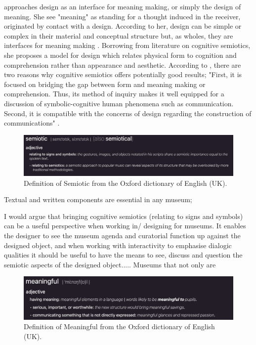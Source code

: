 \autocite{kazmierczak_meaningmaking_2003} approaches design as an interface for meaning making, or simply the design of meaning. She see "meaning" as standing for a thought induced in the receiver, originated by contact with a design. According to her, design can be simple or complex in their material and conceptual structure but, as wholes, they are interfaces for meaning making \autocite[p. 47]{kazmierczak_meaningmaking_2003}. Borrowing from literature on cognitive semiotics, she proposes a model for design which relates physical form to cognition and comprehension rather than appearance and aesthetic. According to \autocite{kazmierczak_meaningmaking_2003}, there are two reasons why cognitive semiotics offers potentially good results; "First, it is focused on bridging the gap between form and meaning making or comprehension. Thus, its method of inquiry makes it well equipped for a discussion of symbolic-cognitive human phenomena such as communication. Second, it is compatible with the concerns of design regarding the construction of communications" \autocite[p. 47]{kazmierczak_meaningmaking_2003}. 

\begin{figure}[H]
\includegraphics[width=12.5cm]{pictures/background/semiotic.png}
\caption{Definition of Semiotic from the Oxford dictionary of English (UK).}
\centering
\end{figure}

Textual and written components are essential in any museum; 

I would argue that bringing cognitive semiotics (relating to signs and symbols) can be a useful perspective when working in/ designing for museums. It enables the designer to see the museum agenda and curatorial function up against the designed object, and when working with interactivity to emphasise dialogic qualities it should be useful to have the means to see, discuss and question the semiotic aspects of the designed object..... Museums that not only are 

\begin{figure}[H]
\includegraphics[width=12.5cm]{pictures/background/meaningful.png}
\caption{Definition of Meaningful from the Oxford dictionary of English (UK).}
\centering
\end{figure}


